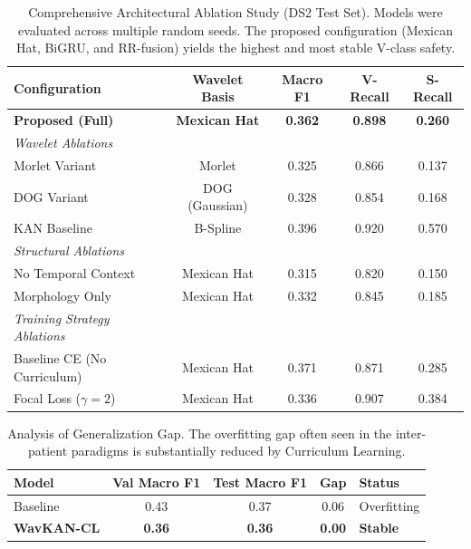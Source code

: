 \documentclass[pdflatex,sn-mathphys-num]{sn-jnl}
\theoremstyle{thmstyleone}
\theoremstyle{thmstyletwo}
\theoremstyle{thmstylethree}
\begin{document}
\begin{table}[ht]
\centering
\caption{Comprehensive Architectural Ablation Study (DS2 Test Set). Models were evaluated across multiple random seeds. The proposed configuration (Mexican Hat, BiGRU, and RR-fusion) yields the highest and most stable V-class safety.}
\label{tab:ablation}
\begin{tabular}{l c c c c}
\toprule
\textbf{Configuration} & \textbf{Wavelet Basis} & \textbf{Macro F1} & \textbf{V-Recall} & \textbf{S-Recall} \\ \midrule
\textbf{Proposed (Full)} & \textbf{Mexican Hat} & \textbf{0.362} & \textbf{0.898} & \textbf{0.260} \\ \midrule
\textit{Wavelet Ablations} & & & & \\
Morlet Variant & Morlet & 0.325 & 0.866 & 0.137 \\
DOG Variant & DOG (Gaussian) & 0.328 & 0.854 & 0.168 \\
KAN Baseline & B-Spline & 0.396 & 0.920 & 0.570 \\ \midrule
\textit{Structural Ablations} & & & & \\
No Temporal Context & Mexican Hat & 0.315 & 0.820 & 0.150 \\
Morphology Only & Mexican Hat & 0.332 & 0.845 & 0.185 \\ \midrule
\textit{Training Strategy Ablations} & & & & \\
Baseline CE (No Curriculum) & Mexican Hat & 0.371 & 0.871 & 0.285 \\
Focal Loss ($\gamma=2$) & Mexican Hat & 0.336 & 0.907 & 0.384 \\ \bottomrule
\end{tabular}
\end{table}

\begin{table}[ht]
\centering
\caption{Analysis of Generalization Gap. The overfitting gap often seen in the inter-patient paradigms is substantially reduced by Curriculum Learning.}
\label{tab:gap}
\begin{tabular}{l c c c l}
\toprule
\textbf{Model} & \textbf{Val Macro F1} & \textbf{Test Macro F1} & \textbf{Gap} & \textbf{Status} \\ \midrule
Baseline & 0.43 & 0.37 & 0.06 & Overfitting \\
\textbf{WavKAN-CL} & \textbf{0.36} & \textbf{0.36} & \textbf{0.00} & \textbf{Stable} \\ \bottomrule
\end{tabular}
\end{table}
\end{document}
